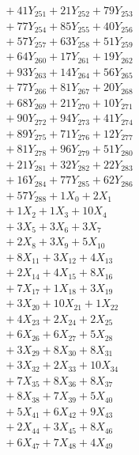 \documentclass[a4paper,10pt]{article}
\begin{document}
{\begin{align}
&\;  + 41 Y_{251} + 21 Y_{252} + 79 Y_{253} \\[0.3ex]
&\;  + 77 Y_{254} + 85 Y_{255} + 40 Y_{256} \\[0.3ex]
&\;  + 57 Y_{257} + 63 Y_{258} + 51 Y_{259} \\[0.3ex]
&\;  + 64 Y_{260} + 17 Y_{261} + 19 Y_{262} \\[0.3ex]
&\;  + 93 Y_{263} + 14 Y_{264} + 56 Y_{265} \\[0.3ex]
&\;  + 77 Y_{266} + 81 Y_{267} + 20 Y_{268} \\[0.5ex]\allowbreak
&\;  + 68 Y_{269} + 21 Y_{270} + 10 Y_{271} \\[0.3ex]
&\;  + 90 Y_{272} + 94 Y_{273} + 41 Y_{274} \\[0.3ex]
&\;  + 89 Y_{275} + 71 Y_{276} + 12 Y_{277} \\[0.3ex]
&\;  + 81 Y_{278} + 96 Y_{279} + 51 Y_{280} \\[0.3ex]
&\;  + 21 Y_{281} + 32 Y_{282} + 22 Y_{283} \\[0.3ex]
&\;  + 16 Y_{284} + 77 Y_{285} + 62 Y_{286} \\[0.3ex]
&\;  + 57 Y_{288} + 1 X_{0} + 2 X_{1} \\[0.3ex]
&\;  + 1 X_{2} + 1 X_{3} + 10 X_{4} \\[0.3ex]
&\;  + 3 X_{5} + 3 X_{6} + 3 X_{7} \\[0.3ex]
&\;  + 2 X_{8} + 3 X_{9} + 5 X_{10} \\[0.5ex]\allowbreak
&\;  + 8 X_{11} + 3 X_{12} + 4 X_{13} \\[0.3ex]
&\;  + 2 X_{14} + 4 X_{15} + 8 X_{16} \\[0.3ex]
&\;  + 7 X_{17} + 1 X_{18} + 3 X_{19} \\[0.3ex]
&\;  + 3 X_{20} + 10 X_{21} + 1 X_{22} \\[0.3ex]
&\;  + 4 X_{23} + 2 X_{24} + 2 X_{25} \\[0.3ex]
&\;  + 6 X_{26} + 6 X_{27} + 5 X_{28} \\[0.3ex]
&\;  + 3 X_{29} + 8 X_{30} + 8 X_{31} \\[0.3ex]
&\;  + 3 X_{32} + 2 X_{33} + 10 X_{34} \\[0.3ex]
&\;  + 7 X_{35} + 8 X_{36} + 8 X_{37} \\[0.3ex]
&\;  + 8 X_{38} + 7 X_{39} + 5 X_{40} \\[0.5ex]\allowbreak
&\;  + 5 X_{41} + 6 X_{42} + 9 X_{43} \\[0.3ex]
&\;  + 2 X_{44} + 3 X_{45} + 8 X_{46} \\[0.3ex]
&\;  + 6 X_{47} + 7 X_{48} + 4 X_{49} \\[0.3ex]

\end{align}}
\end{document}
